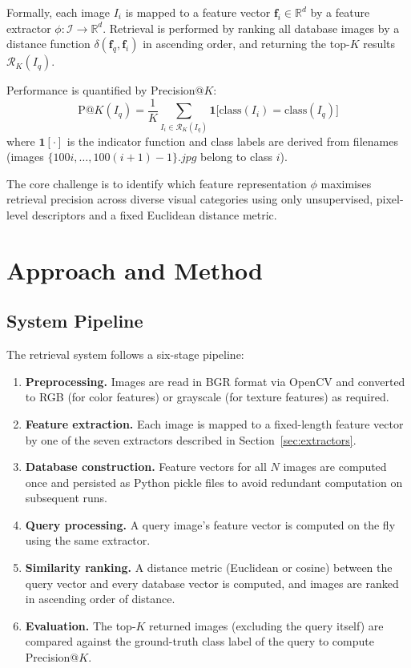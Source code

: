 \documentclass[12pt, a4paper]{article}
\begin{document}
Formally, each image $I_i$ is mapped to a feature vector $\mathbf{f}_i \in \mathbb{R}^d$
by a feature extractor $\phi: \mathcal{I} \rightarrow \mathbb{R}^d$. Retrieval is performed
by ranking all database images by a distance function $\delta(\mathbf{f}_q, \mathbf{f}_i)$ in
ascending order, and returning the top-$K$ results $\mathcal{R}_K(I_q)$.

Performance is quantified by Precision@$K$:
\begin{equation}
    \text{P@}K(I_q) = \frac{1}{K} \sum_{I_i \in \mathcal{R}_K(I_q)}
                      \mathbf{1}\bigl[\text{class}(I_i) = \text{class}(I_q)\bigr]
\end{equation}
where $\mathbf{1}[\cdot]$ is the indicator function and class labels are derived from
filenames (images $\{100i,\ldots,100(i+1)-1\}.jpg$ belong to class $i$).

The core challenge is to identify which feature representation $\phi$ maximises retrieval
precision across diverse visual categories using only unsupervised, pixel-level descriptors
and a fixed Euclidean distance metric.

\section{Approach and Method}

\subsection{System Pipeline}

The retrieval system follows a six-stage pipeline:

\begin{enumerate}[noitemsep]
    \item \textbf{Preprocessing.} Images are read in BGR format via OpenCV and converted
          to RGB (for color features) or grayscale (for texture features) as required.
    \item \textbf{Feature extraction.} Each image is mapped to a fixed-length feature vector
          by one of the seven extractors described in Section~\ref{sec:extractors}.
    \item \textbf{Database construction.} Feature vectors for all $N$ images are computed
          once and persisted as Python pickle files to avoid redundant computation on
          subsequent runs.
    \item \textbf{Query processing.} A query image's feature vector is computed on the fly
          using the same extractor.
    \item \textbf{Similarity ranking.} A distance metric (Euclidean or cosine) between the
          query vector and every database vector is computed, and images are ranked in
          ascending order of distance.
    \item \textbf{Evaluation.} The top-$K$ returned images (excluding the query itself) are
          compared against the ground-truth class label of the query to compute Precision@$K$.
\end{enumerate}
\end{document}
